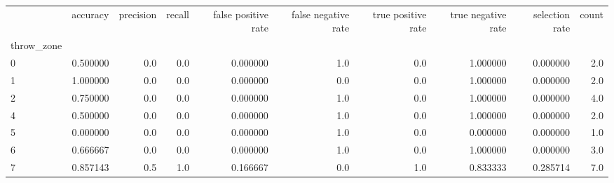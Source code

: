 \begin{tabular}{lrrrrrrrrr}
\toprule
{} &  accuracy &  precision &  recall &  false positive rate &  false negative rate &  true positive rate &  true negative rate &  selection rate &  count \\
throw\_zone &           &            &         &                      &                      &                     &                     &                 &        \\
\midrule
0          &  0.500000 &        0.0 &     0.0 &             0.000000 &                  1.0 &                 0.0 &            1.000000 &        0.000000 &    2.0 \\
1          &  1.000000 &        0.0 &     0.0 &             0.000000 &                  0.0 &                 0.0 &            1.000000 &        0.000000 &    2.0 \\
2          &  0.750000 &        0.0 &     0.0 &             0.000000 &                  1.0 &                 0.0 &            1.000000 &        0.000000 &    4.0 \\
4          &  0.500000 &        0.0 &     0.0 &             0.000000 &                  1.0 &                 0.0 &            1.000000 &        0.000000 &    2.0 \\
5          &  0.000000 &        0.0 &     0.0 &             0.000000 &                  1.0 &                 0.0 &            0.000000 &        0.000000 &    1.0 \\
6          &  0.666667 &        0.0 &     0.0 &             0.000000 &                  1.0 &                 0.0 &            1.000000 &        0.000000 &    3.0 \\
7          &  0.857143 &        0.5 &     1.0 &             0.166667 &                  0.0 &                 1.0 &            0.833333 &        0.285714 &    7.0 \\
\bottomrule
\end{tabular}
